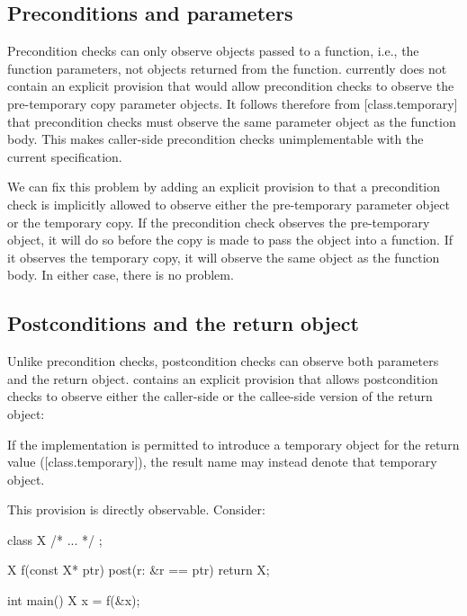 \subsection{Preconditions and parameters}
\label{pre}

Precondition checks can only observe objects passed to a function, i.e., the function parameters, not objects returned from the function. \cite{P2900R10} currently does not contain an explicit provision that would allow precondition checks to observe the pre-temporary copy parameter objects. It follows therefore from [class.temporary] that precondition checks must observe the same parameter object as the function body. This makes caller-side precondition checks unimplementable with the current specification.

We can fix this problem by adding an explicit provision to \cite{P2900R10} that a precondition check is implicitly allowed to observe either the pre-temporary parameter object or the temporary copy. If the precondition check observes the pre-temporary object, it will do so before the copy is made to pass the object into a function. If it observes the temporary copy, it will observe the same object as the function body. In either case, there is no problem.

\subsection{Postconditions and the return object}

Unlike precondition checks, postcondition checks can observe both parameters and the return object. \cite{P2900R10} contains an explicit provision that allows postcondition checks to observe either the caller-side or the callee-side version of the return object:

\begin{adjustwidth}{0.5cm}{0.5cm}
If the implementation is permitted to introduce a temporary object for the return value
([class.temporary]), the result name may instead denote that temporary object.
\end{adjustwidth}

This provision is directly observable. Consider:

\begin{codeblock}
class X { /* ... */ };

X f(const X* ptr) post(r: &r == ptr) {
  return X{};
}

int main() {
  X x = f(&x);
}
\end{codeblock}

